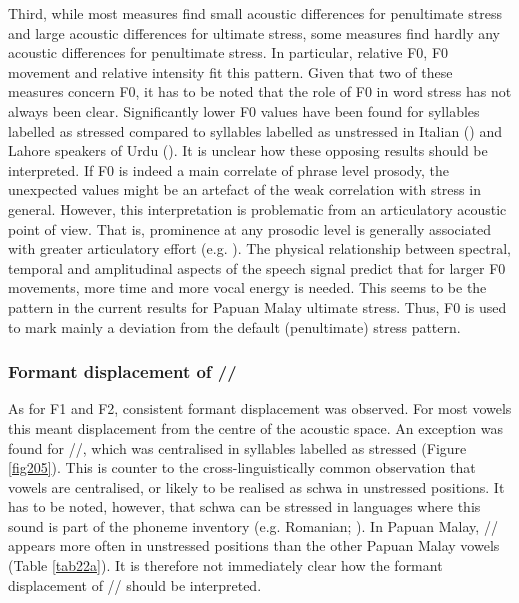 Third, while most measures find small acoustic differences for penultimate stress and large acoustic differences for ultimate stress, some measures find hardly any acoustic differences for penultimate stress. In particular, relative F0, F0 movement and relative intensity fit this pattern. Given that two of these measures concern F0, it has to be noted that the role of F0 in word stress has not always been clear. Significantly lower F0 values have been found for syllables labelled as stressed compared to syllables labelled as unstressed in Italian (\citealt{eriksson_acoustics_2016}) and Lahore speakers of Urdu (\citealt{hussain_phonetic_2007}). It is unclear how these opposing results should be interpreted. If F0 is indeed a main correlate of phrase level prosody, the unexpected values might be an artefact of the weak correlation with stress in general. However, this interpretation is problematic from an articulatory acoustic point of view. That is, prominence at any prosodic level is generally associated with greater articulatory effort (e.g. \citealt{streefkerk_prominence_2002}). The physical relationship between spectral, temporal and amplitudinal aspects of the speech signal predict that for larger F0 movements, more time and more vocal energy is needed. This seems to be the pattern in the current results for Papuan Malay ultimate stress. Thus, F0 is used to mark mainly a deviation from the default (penultimate) stress pattern.

\subsubsection{Formant displacement of //} \label{sec2452}
As for F1 and F2, consistent formant displacement was observed. For most vowels this meant displacement from the centre of the acoustic space. An exception was found for //, which was centralised in syllables labelled as stressed (Figure \ref{fig205}). This is counter to the cross-linguistically common observation that vowels are centralised, or likely to be realised as schwa in unstressed positions. It has to be noted, however, that schwa can be stressed in languages where this sound is part of the phoneme inventory (e.g. Romanian; \citealt{chitoran_phonology_2002}). In Papuan Malay, // appears more often in unstressed positions than the other Papuan Malay vowels (Table \ref{tab22a}). It is therefore not immediately clear how the formant displacement of // should be interpreted.\par

